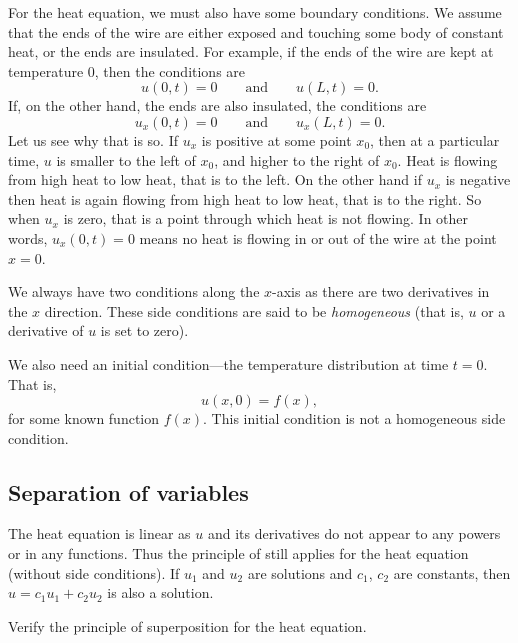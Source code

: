 For the heat equation, we must also have some
boundary conditions.
We assume that the ends of the wire are either exposed 
and touching some body of constant heat, or the ends are insulated.
For example, if the ends of the wire are kept at temperature 0, then
the conditions are
\begin{equation*}
u(0,t) = 0 \qquad \text{and} \qquad u(L,t) = 0.
\end{equation*}
If, on the other hand, the ends are also insulated, the conditions are
\begin{equation*}
u_x(0,t) = 0 \qquad \text{and} \qquad
u_x(L,t) = 0 .
\end{equation*}
Let us see why that is so.
If $u_x$ is positive at some point $x_0$, then at a particular time,
$u$ is smaller to the left of $x_0$, and higher to the right of $x_0$.
Heat is flowing from high heat to low heat, that is to the left.
On the other hand if $u_x$ is negative then heat is again flowing
from high heat to low
heat, that is to the right.  So when $u_x$ is zero, that is a point through
which heat is not flowing.  In other words, $u_x(0,t) = 0$ means
no heat is flowing in or out of the wire at the point $x=0$.

We always have two conditions along the $x$-axis as there are
two derivatives in the $x$ direction.
These side conditions are said to be
\emph{homogeneous}
(that is, $u$ or a derivative of $u$ is set to zero).

We also need an initial condition---the temperature distribution
at time $t=0$.  That is,
\begin{equation*}
u(x,0) = f(x) ,
\end{equation*}
for some known function $f(x)$.
This initial condition is not a homogeneous side condition.

\subsection{Separation of variables}

The heat equation is linear as $u$ and its derivatives do not
appear to any powers or in any functions.
Thus the principle of  still applies for
the heat equation
(without side conditions).
If $u_1$ and $u_2$ are
solutions and $c_1$, $c_2$ are constants, then
$u = c_1 u_1 + c_2 u_2$ is also a solution.

\begin{exercise}
Verify the principle of superposition for the heat equation.
\end{exercise}


